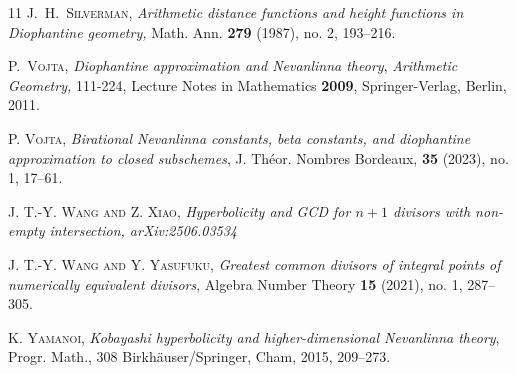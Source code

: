 \documentclass[10pt]{amsart}
\numberwithin{equation}{section}
\theoremstyle{plain}
\theoremstyle{definition}
\begin{document}
\begin{thebibliography}{11}
 \textsc{J.~H.~Silverman,} \emph{Arithmetic distance functions and height functions in Diophantine geometry,}
 Math. Ann. {\bf 279} (1987), no. 2, 193--216.

\textsc{P.~Vojta,} \emph{Diophantine approximation and Nevanlinna theory}, {\it Arithmetic Geometry,} 111-224, Lecture Notes in Mathematics {\bf 2009}, Springer-Verlag, Berlin, 2011.

 \textsc{P. Vojta,} 
 \emph{Birational Nevanlinna constants, beta constants, and diophantine approximation to closed subschemes}, J. Th\'eor. Nombres Bordeaux, {\bf 35} (2023), no. 1, 17--61.
 
  \textsc{J. T.-Y. Wang and Z. Xiao,} 
 \emph{Hyperbolicity and GCD for $n+1$  divisors with non-empty intersection, arXiv:2506.03534}
 

\textsc{J. T.-Y. Wang and Y. Yasufuku}, \textit{Greatest common divisors of integral points of numerically equivalent divisors}, Algebra Number Theory {\bf 15} (2021), no. 1, 287--305.

 \textsc{K. Yamanoi},  
\textit{ Kobayashi hyperbolicity and higher-dimensional Nevanlinna theory}, 
Progr. Math., 308
Birkh\"auser/Springer, Cham, 2015, 209--273.

\end{thebibliography}
\end{document}
